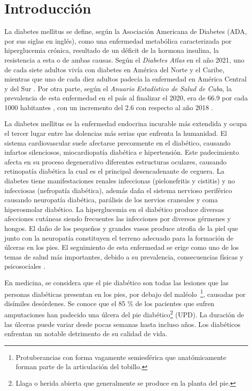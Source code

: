 \chapter*{Introducción}\label{chapter:introduction}

La diabetes mellitus se define, según la Asociación Americana de Diabetes (ADA, por sus siglas en inglés), como una enfermedad metabólica caracterizada por hiperglucemia crónica, resultado de un déficit de la hormona insulina, la resistencia a esta o de ambas causas. Según el \textit{Diabetes Atlas} en el año 2021, uno de cada siete adultos vivía con diabetes en América del Norte y el Caribe, mientras que uno de cada diez adultos padecía  la enfermedad en América Central y del Sur \cite{diabetesAtlas}. Por otra parte, según el \textit{Anuario Estadístico de Salud de Cuba}, la prevalencia de esta enfermedad en el país al finalizar el 2020, era de 66.9 por cada 1000 habitantes \cite{anuario2020}, con un incremento del 2.6 con respecto al año 2018 \cite{anuario2018}.

La diabetes mellitus es la enfermedad endocrina incurable más extendida y ocupa el tercer lugar entre las dolencias más serias que enfrenta la humanidad. El sistema cardiovascular suele afectarse precozmente en el diabético, causando infartos silenciosos, miocardiopatía diabética e hipertensión. Este padecimiento afecta en su proceso degenerativo diferentes estructuras oculares, causando retinopatía diabética la cual es el principal desencadenante de ceguera. La diabetes tiene manifestaciones renales infeccionas (pielonefritis y cistitis) y no infecciosas (nefropatía diabética), además daña el sistema nervioso periférico causando neuropatía diabética, parálisis de los nervios craneales y coma hiperosmolar diabético. La hiperglucemia en el diabético produce diversas afecciones cutáneas siendo frecuentes las infecciones por diversos gérmenes y hongos. El daño de los pequeños y grandes vasos produce atrofia de la piel que junto con la neuropatía constituyen el terreno adecuado para la formación de úlceras en los pies. El seguimiento de esta enfermedad se erige como uno de los temas de salud más importantes, debido a su prevalencia, consecuencias físicas y psicosociales \cite{roca}.

En medicina, se considera que el pie diabético son todas las lesiones que las personas diabéticas presentan en los pies, por debajo del maléolo~\footnote{Protuberancias con forma vagamente semiesférica que anatómicamente forman parte de la articulación del tobillo.}, causadas por disímiles desórdenes. Se conoce que el 85 \% de los pacientes que sufren amputaciones han padecido una úlcera del pie diabético\footnote{Llaga o herida abierta que generalmente se produce en la planta del pie.} (UPD). La duración de las úlceras puede variar desde pocas semanas hasta incluso años. Los diabéticos enfrentan un notable detrimento de su calidad de vida. 

